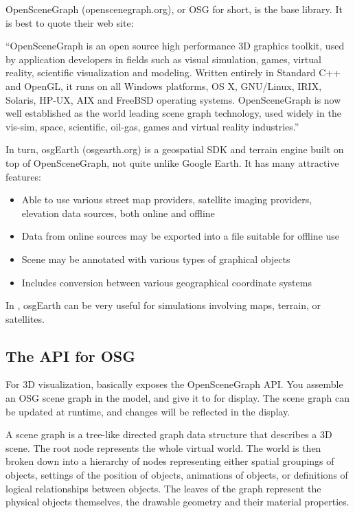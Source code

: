OpenSceneGraph (openscenegraph.org), or OSG for short, is the base library.
It is best to quote their web site:

\begin{displayquote}
``OpenSceneGraph is an open source high performance 3D graphics toolkit,
used by application developers in fields such as visual simulation, games,
virtual reality, scientific visualization and modeling. Written entirely in
Standard C++ and OpenGL, it runs on all Windows platforms, OS X, GNU/Linux,
IRIX, Solaris, HP-UX, AIX and FreeBSD operating systems. OpenSceneGraph is
now well established as the world leading scene graph technology, used
widely in the vis-sim, space, scientific, oil-gas, games and virtual
reality industries.''
\end{displayquote}

In turn, osgEarth (osgearth.org) is a geospatial SDK and terrain engine built on top
of OpenSceneGraph, not quite unlike Google Earth. It has many attractive features:

\begin{itemize}
\item Able to use various street map providers, satellite imaging providers,
      elevation data sources, both online and offline
\item Data from online sources may be exported into a file suitable for offline use
\item Scene may be annotated with various types of graphical objects
\item Includes conversion between various geographical coordinate systems
\end{itemize}

In \opp, osgEarth can be very useful for simulations involving maps, terrain,
or satellites.

\subsection{The {\opp} API for OSG}

For 3D visualization, {\opp} basically exposes the OpenSceneGraph API.
You assemble an OSG scene graph in the model, and give it to {\opp} for
display. The scene graph can be updated at runtime, and changes will be
reflected in the display.

\begin{note}
 A scene graph is a tree-like directed graph
data structure that describes a 3D scene. The root node represents the
whole virtual world. The world is then broken down into a hierarchy of
nodes representing either spatial groupings of objects, settings of
the position of objects, animations of objects, or definitions of
logical relationships between objects. The leaves of the graph
represent the physical objects themselves, the drawable geometry and
their material properties.
\end{note}

